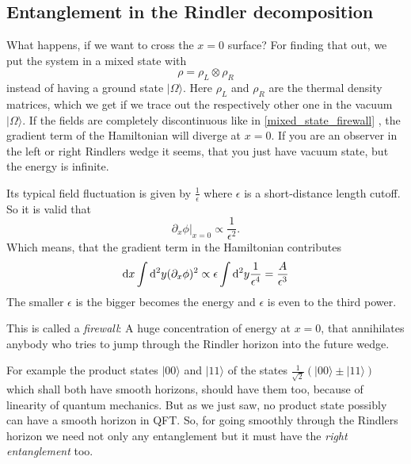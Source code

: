 \subsection{Entanglement in the Rindler decomposition \checkmark}
	What happens, if we want to cross the $x=0$ surface? For finding that out, we put the system in a mixed state with
		\begin{equation} \label{mixed_state_firewall}
			\rho=\rho_L \otimes \rho_R
		\end{equation}
	instead of having a ground state $|\Omega\rangle$. Here $\rho_L$ and $\rho_R$ are the thermal density matrices, which we get if we trace out the respectively other one in the vacuum $|\Omega\rangle$.
	If the fields are completely discontinuous like in \eqref{mixed_state_firewall} , the gradient term of the Hamiltonian will diverge at $x=0$. If you are an observer in the left or right Rindlers wedge it seems, that you just have vacuum state, but the energy is infinite. 
	
	Its typical field fluctuation is given by $\frac{1}{\epsilon}$ where $\epsilon$ is a short-distance length cutoff.  So it is valid that
		\begin{equation}
			\partial_x \phi|_{x=0} \propto \frac{1}{\epsilon^2}.
		\end{equation}
	Which means, that the gradient term in the Hamiltonian contributes
		\begin{equation}
			\mathrm{d} x \int \mathrm{d}^2 y (\partial_x\phi)^2 \propto 
			\epsilon \int \mathrm{d}^2 y \frac{1}{\epsilon^4} 
			= \frac{A}{\epsilon^3}
		\end{equation}	
	The smaller $\epsilon$ is the bigger becomes the energy and $\epsilon$ is even to the third power.
	 			
	This is called a \textit{firewall}: A huge concentration of energy at $x=0$, that annihilates anybody who tries to jump through the Rindler horizon into the future wedge.
	
	For example the product states $|00\rangle$ and $|11\rangle$ of the states $\frac{1}{\sqrt{2}}
	(|00\rangle \pm |11\rangle)$ which shall both have smooth horizons, should have them too, because of linearity of quantum mechanics. But as we just saw, no product state possibly can have a smooth horizon in QFT. So, for going smoothly through the Rindlers horizon we need not only any entanglement but it must have the \textit{right entanglement} too.